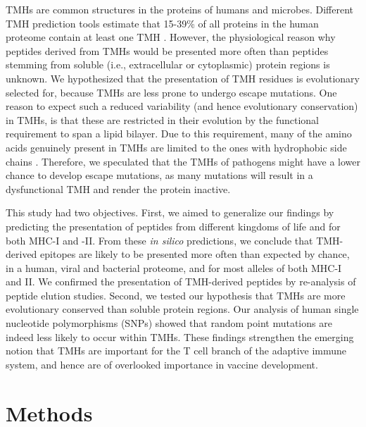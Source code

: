 TMHs are common structures in the proteins of humans and microbes. 
Different TMH prediction tools estimate that 15-39\% of all proteins 
in the human proteome contain at least one TMH \cite{ahram2006estimation}.
However, the physiological reason why peptides derived from TMHs 
would be presented more often than peptides 
stemming from soluble (i.e., extracellular or cytoplasmic) protein regions is unknown. 
We hypothesized that the presentation of 
TMH residues is evolutionary selected for, 
because TMHs are less prone to undergo escape mutations. 
One reason to expect such a reduced 
variability (and hence evolutionary conservation) in TMHs, 
is that these are restricted in their evolution 
by the functional requirement to span a lipid bilayer. 
Due to this requirement, 
many of the amino acids genuinely present in TMHs 
are limited to the ones with hydrophobic side chains 
\cite{hessa2007molecular,jones1994model}.
Therefore, we speculated that the TMHs of pathogens 
might have a lower chance to develop escape mutations, 
as many mutations will result in a dysfunctional TMH 
and render the protein inactive.

This study had two objectives. 
First, we aimed to generalize our findings by predicting the presentation of peptides 
from different kingdoms of life and for both MHC-I and -II. 
From these \emph{in silico} predictions, we conclude that TMH-derived
epitopes are likely to be presented more often than expected by chance,
in a human, viral and bacterial proteome, 
and for most alleles of both MHC-I and II. 
We confirmed the presentation of TMH-derived peptides 
by re-analysis of peptide elution studies. 
Second, we tested our hypothesis that TMHs 
are more evolutionary conserved than soluble protein regions. 
Our analysis of human single nucleotide polymorphisms (SNPs) showed 
that random point mutations are indeed less likely
to occur within TMHs. 
These findings strengthen the emerging notion 
that TMHs are important for the T cell branch of the adaptive immune system, 
and hence are of  
overlooked importance in vaccine development.

\section{Methods}

